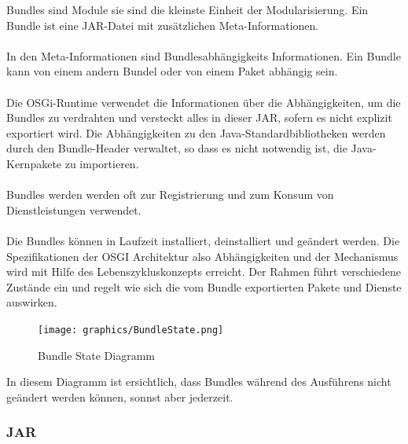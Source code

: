Bundles sind Module sie sind die kleinste Einheit der Modularisierung. Ein Bundle ist eine JAR-Datei mit zusätzlichen Meta-Informationen.\\
\\
In den Meta-Informationen sind Bundlesabhängigkeits Informationen. Ein Bundle kann von einem andern Bundel oder von einem Paket abhängig sein.\\
\\
Die OSGi-Runtime verwendet die Informationen über die Abhängigkeiten, um die Bundles zu verdrahten und versteckt alles in dieser JAR, sofern es nicht explizit exportiert wird. Die Abhängigkeiten zu den Java-Standardbibliotheken werden durch den Bundle-Header verwaltet, so dass es nicht notwendig ist, die Java-Kernpakete zu importieren.\\
\\
Bundles werden werden oft zur Registrierung und zum Konsum von Dienstleistungen verwendet.\\
\\
Die Bundles können in Laufzeit installiert, deinstalliert und geändert werden. Die Spezifikationen der OSGI Architektur also Abhängigkeiten und der Mechanismus wird mit Hilfe des Lebenszykluskonzepts erreicht. Der Rahmen führt verschiedene Zustände ein und regelt wie sich die vom Bundle exportierten Pakete und Dienste auswirken. 

 \begin{figure}[H]
	\centering
	\texttt{[image: graphics/BundleState.png]}
	\caption{Bundle State Diagramm} 	
	\label{pic: BundleState}
\end{figure} 

In diesem Diagramm ist ersichtlich, dass Bundles während des Ausführens nicht geändert werden können, sonnst aber jederzeit.

\subsubsection{JAR}
